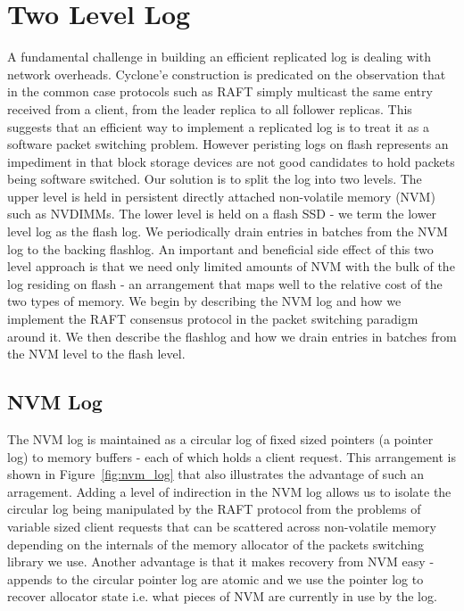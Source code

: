 \documentclass[10pt, preprint, nonatbib]{sigplanconf}
\begin{document}
\section{Two Level Log}
A fundamental challenge in building an efficient replicated log is dealing with
network overheads. Cyclone'e construction is predicated on the observation that
in the common case protocols such as RAFT simply multicast the same entry
received from a client, from the leader replica to all follower replicas. This
suggests that an efficient way to implement a replicated log is to treat it as a
software packet switching problem. However peristing logs on flash represents an
impediment in that block storage devices are not good candidates to hold packets
being software switched. Our solution is to split the log into two levels. The
upper level is held in persistent directly attached non-volatile memory (NVM)
such as NVDIMMs. The lower level is held on a flash SSD - we term the lower
level log as the flash log. We periodically drain entries in batches from the
NVM log to the backing flashlog. An important and beneficial side effect of this
two level approach is that we need only limited amounts of NVM with the bulk of
the log residing on flash - an arrangement that maps well to the relative cost
of the two types of memory. We begin by describing the NVM log and how we
implement the RAFT consensus protocol in the packet switching paradigm around
it. We then describe the flashlog and how we drain entries in batches from the
NVM level to the flash level.

\subsection{NVM Log}
The NVM log is maintained as a circular log of fixed sized pointers (a pointer
log) to memory buffers - each of which holds a client request. This arrangement
is shown in Figure~\ref{fig:nvm_log} that also illustrates the advantage of
such an arragement. Adding a level of indirection in the NVM log allows us to
isolate the circular log being manipulated by the RAFT protocol from the
problems of variable sized client requests that can be scattered across
non-volatile memory depending on the internals of the memory allocator of the
packets switching library we use. Another advantage is that it makes recovery
from NVM easy - appends to the circular pointer log are atomic and we use the
pointer log to recover allocator state i.e. what pieces of NVM are currently in
use by the log.
\end{document}
